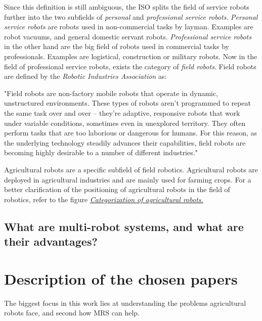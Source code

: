         Since this definition is still ambiguous, the ISO splits the field of service robots further into the two subfields of \emph{personal} and \emph{professional service robots}. \emph{Personal service robots} are robots used in non-commercial tasks by layman. Examples are robot vacuums, and general domestic servant robots. \emph{Professional service robots} in the other hand are the big field of robots used in commercial tasks by professionals. Examples are logistical, construction or military robots.
        Now in the field of professional service robots, exists the category of \emph{field robots}. Field robots are defined by the \emph{Robotic Industries Association} as:
        \begin{displayquote}
            "Field robots are non-factory mobile robots that operate in dynamic, unstructured environments. These types of robots aren’t programmed to repeat the same task over and over – they’re adaptive, responsive robots that work under variable conditions, sometimes even in unexplored territory. They often perform tasks that are too laborious or dangerous for humans. For this reason, as the underlying technology steadily advances their capabilities, field robots are becoming highly desirable to a number of different industries."
        \end{displayquote}

        Agricultural robots are a specific subfield of field robotics. Agricultural robots are deployed in agricultural industries and are mainly used for farming crops. For a better clarification of the positioning of agricultural robots in the field of robotics, refer to the figure \hyperlink{fig:category_mindmap}{\emph{Categorization of agricultural robots.}}

        \section{What are multi-robot systems, and what are their advantages?}


    \chapter{Description of the chosen papers}

    The biggest focus in this work lies at understanding the problems agricultural robots face, and second how MRS can help.

